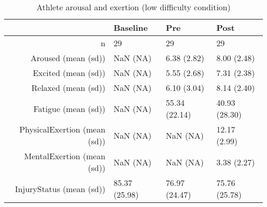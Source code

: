 \begin{table}[ht]
\centering
\begin{tabular}{rlll}
  \hline
 & Baseline & Pre & Post \\ 
  \hline
n &    29 &    29 &    29 \\ 
  Aroused (mean (sd)) &   NaN (NA) &  6.38 (2.82) &  8.00 (2.48) \\ 
  Excited (mean (sd)) &   NaN (NA) &  5.55 (2.68) &  7.31 (2.38) \\ 
  Relaxed (mean (sd)) &   NaN (NA) &  6.10 (3.04) &  8.14 (2.40) \\ 
  Fatigue (mean (sd)) &   NaN (NA) & 55.34 (22.14) & 40.93 (28.30) \\ 
  PhysicalExertion (mean (sd)) &   NaN (NA) &   NaN (NA) & 12.17 (2.99) \\ 
  MentalExertion (mean (sd)) &   NaN (NA) &   NaN (NA) &  3.38 (2.27) \\ 
  InjuryStatus (mean (sd)) & 85.37 (25.98) & 76.97 (24.47) & 75.76 (25.78) \\ 
   \hline
\end{tabular}
\caption{Athlete arousal and exertion 
 (low difficulty condition)} 
\end{table}
